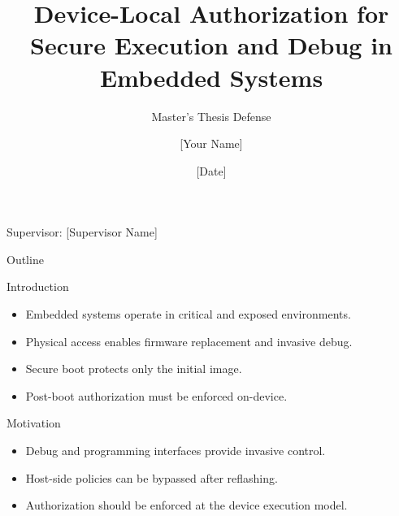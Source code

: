\documentclass[aspectratio=169]{beamer}
\title{Device-Local Authorization for Secure Execution and Debug in Embedded Systems}
\subtitle{Master's Thesis Defense}
\author{[Your Name]}
\institute{[Department / University]}
\date{[Date]}
\begin{document}
\begin{frame}
  \titlepage
  \vspace{1ex}
  \centering
  \small Supervisor: [Supervisor Name]
\end{frame}

\begin{frame}{Outline}
  \centering
\end{frame}

\begin{frame}{Introduction}
  \begin{itemize}
    \item Embedded systems operate in critical and exposed environments.
    \item Physical access enables firmware replacement and invasive debug.
    \item Secure boot protects only the initial image.
    \item Post-boot authorization must be enforced on-device.
  \end{itemize}
\end{frame}

\begin{frame}{Motivation}
  \begin{itemize}
    \item Debug and programming interfaces provide invasive control.
    \item Host-side policies can be bypassed after reflashing.
    \item Authorization should be enforced at the device execution model.
  \end{itemize}
\end{frame}
\end{document}
